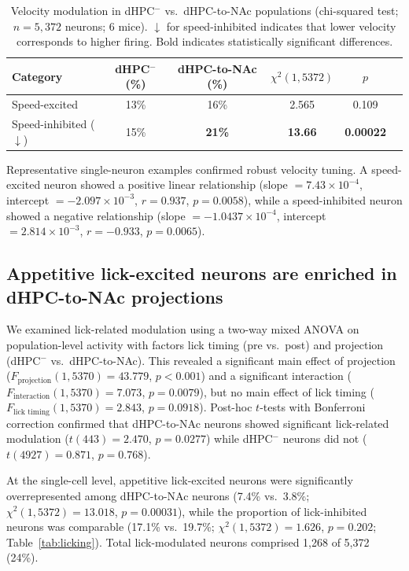 \documentclass[11pt]{article}
\begin{document}
\begin{table}[H]
\centering
\caption{Velocity modulation in dHPC$^{-}$ vs.\ dHPC-to-NAc populations (chi-squared test; $n=5{,}372$ neurons; 6 mice). $\downarrow$ for speed-inhibited indicates that lower velocity corresponds to higher firing. Bold indicates statistically significant differences.}
\label{tab:velocity}
\begin{tabular}{lccccc}
\toprule
Category & dHPC$^{-}$ (\%) & dHPC-to-NAc (\%) & $\chi^{2}(1, 5372)$ & $p$ \\
\midrule
Speed-excited & 13\% & 16\% & 2.565 & 0.109 \\
Speed-inhibited ($\downarrow$) & 15\% & \textbf{21\%} & \textbf{13.66} & \textbf{0.00022} \\
\bottomrule
\end{tabular}
\end{table}

Representative single-neuron examples confirmed robust velocity tuning. A speed-excited neuron showed a positive linear relationship (slope $= 7.43 \times 10^{-4}$, intercept $= -2.097 \times 10^{-3}$, $r=0.937$, $p=0.0058$), while a speed-inhibited neuron showed a negative relationship (slope $= -1.0437 \times 10^{-4}$, intercept $= 2.814 \times 10^{-3}$, $r=-0.933$, $p=0.0065$).

\subsection{Appetitive lick-excited neurons are enriched in dHPC-to-NAc projections}

We examined lick-related modulation using a two-way mixed ANOVA on population-level activity with factors lick timing (pre vs.\ post) and projection (dHPC$^{-}$ vs.\ dHPC-to-NAc). This revealed a significant main effect of projection ($F_{\text{projection}}(1, 5370)=43.779$, $p<0.001$) and a significant interaction ($F_{\text{interaction}}(1, 5370)=7.073$, $p=0.0079$), but no main effect of lick timing ($F_{\text{lick timing}}(1, 5370)=2.843$, $p=0.0918$). Post-hoc $t$-tests with Bonferroni correction confirmed that dHPC-to-NAc neurons showed significant lick-related modulation ($t(443)=2.470$, $p=0.0277$) while dHPC$^{-}$ neurons did not ($t(4927)=0.871$, $p=0.768$).

At the single-cell level, appetitive lick-excited neurons were significantly overrepresented among dHPC-to-NAc neurons (7.4\% vs.\ 3.8\%; $\chi^{2}(1, 5372)=13.018$, $p=0.00031$), while the proportion of lick-inhibited neurons was comparable (17.1\% vs.\ 19.7\%; $\chi^{2}(1, 5372)=1.626$, $p=0.202$; Table~\ref{tab:licking}). Total lick-modulated neurons comprised 1,268 of 5,372 (24\%).
\end{document}
